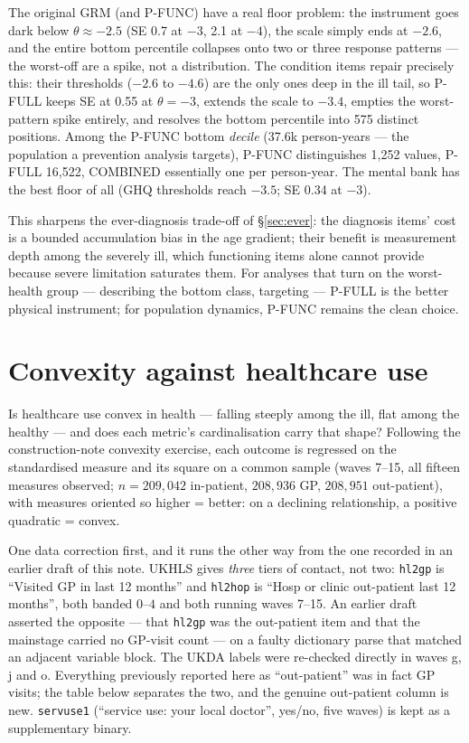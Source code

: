 \documentclass[11pt]{article}
\newcommand{\code}[1]{\texttt{\small #1}}
\begin{document}
The original GRM (and P-FUNC) have a real floor problem: the instrument goes
dark below $\theta\approx-2.5$ (SE 0.7 at $-3$, 2.1 at $-4$), the scale
simply ends at $-2.6$, and the entire bottom percentile collapses onto two
or three response patterns --- the worst-off are a spike, not a
distribution. The condition items repair precisely this: their thresholds
($-2.6$ to $-4.6$) are the only ones deep in the ill tail, so P-FULL keeps
SE at 0.55 at $\theta=-3$, extends the scale to $-3.4$, empties the
worst-pattern spike entirely, and resolves the bottom percentile into 575
distinct positions. Among the P-FUNC bottom \emph{decile} (37.6k
person-years --- the population a prevention analysis targets), P-FUNC
distinguishes 1{,}252 values, P-FULL 16{,}522, COMBINED essentially one per
person-year. The mental bank has the best floor of all (GHQ thresholds reach
$-3.5$; SE 0.34 at $-3$).

This sharpens the ever-diagnosis trade-off of \S\ref{sec:ever}: the
diagnosis items' cost is a bounded accumulation bias in the age gradient;
their benefit is measurement depth among the severely ill, which
functioning items alone cannot provide because severe limitation saturates
them. For analyses that turn on the worst-health group --- describing the
bottom class, targeting --- P-FULL is the better physical instrument; for
population dynamics, P-FUNC remains the clean choice.

\section{Convexity against healthcare use}
\label{sec:convexity}

Is healthcare use convex in health --- falling steeply among the ill, flat
among the healthy --- and does each metric's cardinalisation carry that
shape? Following the construction-note convexity exercise, each outcome is
regressed on the standardised measure and its square on a common sample
(waves 7--15, all fifteen
measures observed; $n = 209{,}042$ in-patient, $208{,}936$ GP,
$208{,}951$ out-patient), with measures oriented so higher = better: on a
declining relationship, a positive quadratic = convex.

One data correction first, and it runs the other way from the one recorded in
an earlier draft of this note. UKHLS gives \emph{three} tiers of contact, not
two: \code{hl2gp} is ``Visited GP in last 12 months'' and \code{hl2hop} is
``Hosp or clinic out-patient last 12 months'', both banded $0$--$4$ and both
running waves 7--15. An earlier draft asserted the opposite --- that
\code{hl2gp} was the out-patient item and that the mainstage carried no
GP-visit count --- on a faulty dictionary parse that matched an adjacent
variable block. The UKDA labels were re-checked directly in waves g, j and o.
Everything previously reported here as ``out-patient'' was in fact GP visits;
the table below separates the two, and the genuine out-patient column is new.
\code{servuse1} (``service use: your local doctor'', yes/no, five waves) is
kept as a supplementary binary.
\end{document}
